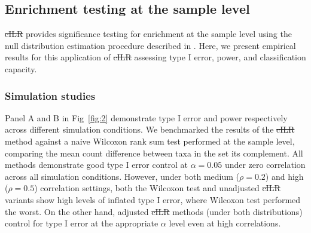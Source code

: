 \documentclass[10pt,letterpaper]{article}
\providecommand{\DIFaddtex}[1]{{\protect\color{blue}\uwave{#1}}} %
\providecommand{\DIFdeltex}[1]{{\protect\color{red}\sout{#1}}}                      %
\providecommand{\DIFaddbegin}{} %
\providecommand{\DIFaddend}{} %
\providecommand{\DIFdelbegin}{} %
\providecommand{\DIFdelend}{} %
\providecommand{\DIFadd}[1]{\texorpdfstring{\DIFaddtex{#1}}{#1}} %
\providecommand{\DIFdel}[1]{\texorpdfstring{\DIFdeltex{#1}}{}} %
\newcommand{\DIFscaledelfig}{0.5}
\newlength{\DIFdelgraphicswidth} %
\newlength{\DIFdelgraphicsheight} %
\newcommand{\DIFaddincludegraphics}[2][]{{\color{blue}\fbox{\DIFOincludegraphics[#1]{#2}}}} %
\newcommand{\DIFdelincludegraphics}[2][]{%
\sbox{\DIFdelgraphicsbox}{\DIFOincludegraphics[#1]{#2}}%
\settoboxwidth{\DIFdelgraphicswidth}{\DIFdelgraphicsbox} %
\settoboxtotalheight{\DIFdelgraphicsheight}{\DIFdelgraphicsbox} %
\scalebox{\DIFscaledelfig}{%
\parbox[b]{\DIFdelgraphicswidth}{\usebox{\DIFdelgraphicsbox}\\[-\baselineskip] \rule{\DIFdelgraphicswidth}{0em}}\llap{\resizebox{\DIFdelgraphicswidth}{\DIFdelgraphicsheight}{%
\setlength{\unitlength}{\DIFdelgraphicswidth}%
\begin{picture}(1,1)%
\thicklines\linethickness{2pt} %
{\color[rgb]{1,0,0}\put(0,0){\framebox(1,1){}}}%
{\color[rgb]{1,0,0}\put(0,0){\line( 1,1){1}}}%
{\color[rgb]{1,0,0}\put(0,1){\line(1,-1){1}}}%
\end{picture}%
}\hspace*{3pt}}} %
} %
\DeclareRobustCommand{\DIFaddbegin}{\DIFOaddbegin \let\includegraphics\DIFaddincludegraphics} %
\DeclareRobustCommand{\DIFaddend}{\DIFOaddend \let\includegraphics\DIFOincludegraphics} %
\DeclareRobustCommand{\DIFdelbegin}{\DIFOdelbegin \let\includegraphics\DIFdelincludegraphics} %
\DeclareRobustCommand{\DIFdelend}{\DIFOaddend \let\includegraphics\DIFOincludegraphics} %
\begin{document}
\subsection*{Enrichment testing at the sample level}
\DIFdelbegin \DIFdel{cILR }\DIFdelend \DIFaddbegin \DIFadd{CBEA }\DIFaddend provides significance testing for enrichment at the sample level using the null distribution estimation procedure described in . Here, we present empirical results for this application of \DIFdelbegin \DIFdel{cILR }\DIFdelend \DIFaddbegin \DIFadd{CBEA }\DIFaddend assessing type I error, power, and classification capacity. 

\subsubsection*{Simulation studies}
Panel A and B in Fig~\ref{fig:2} demonstrate type I error and power respectively across different simulation conditions. We benchmarked the results of the \DIFdelbegin \DIFdel{cILR }\DIFdelend \DIFaddbegin \DIFadd{CBEA }\DIFaddend method against a naive Wilcoxon rank sum test performed at the sample level, comparing the mean count difference between taxa in the set its complement. All methods demonstrate good type I error control at $\alpha = 0.05$ under zero correlation across all simulation conditions. However, under both medium ($\rho = 0.2$) and high ($\rho = 0.5$) correlation settings, both the Wilcoxon test and unadjusted \DIFdelbegin \DIFdel{cILR }\DIFdelend \DIFaddbegin \DIFadd{CBEA }\DIFaddend variants show high levels of inflated type I error, where Wilcoxon test performed the worst. On the other hand, adjusted \DIFdelbegin \DIFdel{cILR }\DIFdelend \DIFaddbegin \DIFadd{CBEA }\DIFaddend methods (under both distributions) control for type I error at the appropriate $\alpha$ level even at high correlations. 
\end{document}
